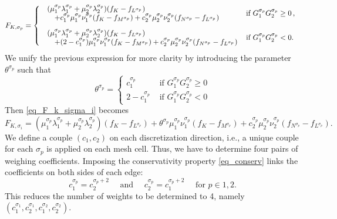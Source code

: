 \documentclass[final,11pt]{elsarticle}
\begin{document}
\begin{equation}
F_{K,\sigma_p}=\left\{
\begin{array}{l@{\ }l}
  \begin{array}{l}
  \displaystyle(\mu_1^{\sigma_p}\lambda_1^{\sigma_p}+\mu_2^{\sigma_p}\lambda_2^{\sigma_p})(f_K-f_{L^{\sigma_p}})\\
  \quad\displaystyle+c_1^{\sigma_p}\mu_1^{\sigma_p}\nu_1^{\sigma_p}(f_K-f_{M^{\sigma_p}})
  +c_2^{\sigma_p}\mu_2^{\sigma_p}\nu_2^{\sigma_p}(f_{N^{\sigma_p}}-f_{L^{\sigma_p}})
  \end{array}
  &\mbox{ if } G_1^{\sigma_p}G_2^{\sigma_p}\geq 0\,,\\[1.5em]
    \begin{array}{l}
    \displaystyle(\mu_1^{\sigma_p}\lambda_1^{\sigma_p}+\mu_2^{\sigma_p}\lambda_2^{\sigma_p})(f_K-f_{L^{\sigma_p}})\\
    \quad\displaystyle+(2-c_1^{\sigma_p})\mu_1^{\sigma_p}\nu_1^{\sigma_p}(f_K-f_{M^{\sigma_p}})
    +c_2^{\sigma_p}\mu_2^{\sigma_p}\nu_2^{\sigma_p}(f_{N^{\sigma_p}}-f_{L^{\sigma_p}})
    \end{array}
    &\mbox{ if }G_1^{\sigma_p}G_2^{\sigma_p}<0.
\end{array}\right.
    \label{eq_F_k_sigma_i}
\end{equation}
We unify the previous expression for more clarity by introducing the parameter $\theta^{\sigma_p}$ such that
\[
\theta^{\sigma_p}=\left\{
    \begin{array}{ll}
    c_1^{\sigma_p}&\text{ if }G_1^{\sigma_p}G_2^{\sigma_p}\geq 0\\[.5em]
    2-c_1^{\sigma_p} &\text{ if }G_1^{\sigma_p}G_2^{\sigma_p}<0
    \end{array}\right.
\]
Then \eqref{eq_F_k_sigma_i} becomes
\begin{equation}
F_{K,\sigma_{i}}=
    (\mu_1^{\sigma_p}\lambda_1^{\sigma_p}+\mu_2^{\sigma_p}\lambda_2^{\sigma_p})(f_K-f_{L^{\sigma_p}})
    +\theta^{\sigma_p}\mu_1^{\sigma_p}\nu_1^{\sigma_p}(f_K-f_{M^{\sigma_p}})+c_2^{\sigma_p}\mu_2^{\sigma_p}\nu_2^{\sigma_p}(f_{N^{\sigma_p}}-f_{L^{\sigma_p}}).
    \label{eq_F_k_sigma_i_theta}
\end{equation}
We define a couple $(c_1,c_2)$ on each discretization direction, i.e., a unique couple for each $\sigma_p$ is applied on each mesh cell. Thus, we have to determine four pairs of weighing coefficients. Imposing the conservativity property \eqref{eq_conserv} links the coefficients on both sides of each edge:
\begin{equation}
    c_1^{\sigma_p}=c_2^{\sigma_p+2}\quad\mbox{ and }\quad c_2^{\sigma_p}=c_1^{\sigma_p+2}\quad
\text{ for }p\in {1,2}.
    \label{eq_c1_c2}
\end{equation}
This reduces the number of weights to be determined to 4, namely $(c_1^{\sigma_1},c_2^{\sigma_1},c_1^{\sigma_2},c_2^{\sigma_2})$.
\end{document}
